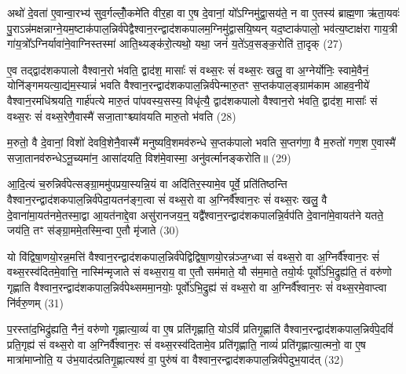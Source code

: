 अथो॑ दे॒वता॑ ए॒वान्वा॒रभ्य॑ सुव॒र्गल्लोँ॒कमे॑ति वीर॒हा वा ए॒ष दे॒वानां॒ यो᳚\-ऽग्निमु॑द्वा॒सय॑ते॒ न वा ए॒तस्य॑ ब्राह्म॒णा ऋ॑ता॒यवः॑ पु॒रा\-ऽन्न॑मक्षन्नाग्ने॒यम॒ष्टाक॑पाल॒न्निर्व॑पेद्वैश्वान॒रन्द्वाद॑शकपालम॒ग्निमु॑द्वासयि॒ष्यन् यद॒ष्टाक॑पालो॒ भव॑त्य॒ष्टाक्ष॑रा गाय॒त्री गा॑य॒त्रो᳚\-ऽग्निर्यावा॑ने॒वाग्निस्तस्मा॑ आति॒थ्यङ्क॑रो॒त्यथो॒ यथा॒ जनं॑ य॒ते॑\-ऽव॒सङ्क॒रोति॑ ता॒दृक् (27)

ए॒व तद्द्वाद॑शकपालो वैश्वान॒रो भ॑वति॒ द्वाद॑श॒ मासाः᳚ सं वथ्स॒रः सं॑ वथ्स॒रः खलु॒ वा अ॒ग्नेर्योनिः॒ स्वामे॒वैनं॒ योनि॑ङ्गमयत्या॒द्य॑म॒स्यान्नं॑ भवति वैश्वान॒रन्द्वाद॑शकपाल॒न्निर्व॑पेन्मारु॒तꣳ स॒प्तक॑पाल॒ङ्ग्राम॑काम आहव॒नीये॑ वैश्वान॒रमधि॑श्रयति॒ गार्\mbox{}ह॑पत्ये मारु॒तं पा॑पवस्य॒सस्य॒ विधृ॑त्यै॒ द्वाद॑शकपालो वैश्वान॒रो भ॑वति॒ द्वाद॑श॒ मासाः᳚ सं वथ्स॒रः सं॑ वथ्स॒रेणै॒वास्मै॑ सजा॒ताꣳश्च्या॑वयति मारु॒तो भ॑वति (28)

म॒रुतो॒ वै दे॒वानां॒ विशो॑ देववि॒शेनै॒वास्मै॑ मनुष्यवि॒शमव॑रुन्धे स॒प्तक॑पालो भवति स॒प्तग॑णा॒ वै म॒रुतो॑ गण॒श ए॒वास्मै॑ सजा॒तानव॑रुन्धे\-ऽनू॒च्यमा॑न॒ आसा॑दयति॒ विश॑मे॒वास्मा॒ अनु॑वर्त्मानङ्करोति॥ (29)

{\anuvakamend[{प्र॒जाका॑मः सं वथ्स॒रः पु॒नात्ये॒वैनं॑ पू॒तः सम॑ष्ट्यै ता॒दृङ्मा॑रु॒तो भ॑व॒त्येका॒न्नत्रि॒ꣳ॒शच्च॑॥५॥}]}

आ॒दि॒त्यं च॒रुन्निर्व॑पेत्सङ्ग्रा॒ममु॑पप्रया॒स्यन्नि॒यं वा अदि॑तिर॒स्यामे॒व पूर्वे॒ प्रति॑तिष्ठन्ति वैश्वान॒रन्द्वाद॑शकपाल॒न्निर्व॑पेदा॒यतन॑ङ्ग॒त्वा सं॑ वथ्स॒रो वा अ॒ग्निर्वै᳚श्वान॒रः सं॑ वथ्स॒रः खलु॒ वै दे॒वाना॑मा॒यत॑नमे॒तस्मा॒द्वा आ॒यत॑नाद्दे॒वा असु॑रानजय॒न्॒ यद्वै᳚श्वान॒रन्द्वाद॑शकपालन्नि॒र्वप॑ति दे॒वाना॑मे॒वायत॑ने यतते॒ जय॑ति॒ तꣳ स॑ङ्ग्रा॒ममे॒तस्मि॒न्वा ए॒तौ मृ॑जाते (30)

यो वि॑द्विषा॒णयो॒रन्न॒मत्ति॑ वैश्वान॒रन्द्वाद॑शकपाल॒न्निर्व॑पेद्विद्विषा॒णयो॒रन्न॑ञ्ज॒ग्ध्वा सं॑ वथ्स॒रो वा अ॒ग्निर्वै᳚श्वान॒रः सं॑ वथ्स॒रस्व॑दितमे॒वात्ति॒ नास्मि॑न्मृजाते सं वथ्स॒राय॒ वा ए॒तौ सम॑माते॒ यौ स॑म॒माते॒ तयो॒र्यः पूर्वो॑\-ऽभि॒द्रुह्य॑ति॒ तं वरु॑णो गृह्णाति वैश्वान॒रन्द्वाद॑शकपाल॒न्निर्व॑पेथ्सममा॒नयोः॒ पूर्वो॑\-ऽभि॒द्रुह्य॑ सं वथ्स॒रो वा अ॒ग्निर्वै᳚श्वान॒रः सं॑ वथ्स॒रमे॒वाप्त्वा नि॑र्वरु॒णम् (31)

प॒रस्ता॑द॒भिद्रु॑ह्यति॒ नैनं॒ वरु॑णो गृह्णात्या॒व्यं॑ वा ए॒ष प्रति॑गृह्णाति॒ यो\-ऽविं॑ प्रतिगृ॒ह्णाति॑ वैश्वान॒रन्द्वाद॑शकपाल॒न्निर्व॑पे॒दविं॑ प्रति॒गृह्य॑ सं वथ्स॒रो वा अ॒ग्निर्वै᳚श्वान॒रः सं॑ वथ्स॒रस्व॑दितामे॒व प्रति॑गृह्णाति॒ नाव्यं॑ प्रति॑गृह्णात्या॒त्मनो॒ वा ए॒ष मात्रा॑माप्नोति॒ य उ॑भ॒याद॑त्प्रतिगृ॒ह्णात्यश्वं॑ वा॒ पुरु॑षं वा वैश्वान॒रन्द्वाद॑शकपाल॒न्निर्व॑पेदुभ॒याद॑त् (32)

